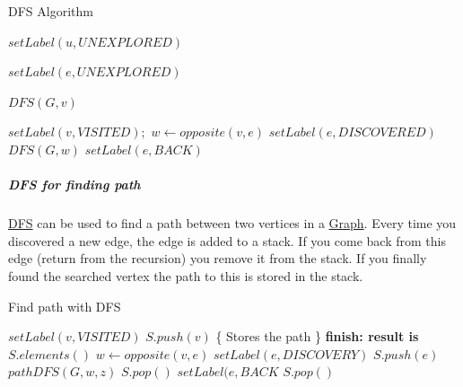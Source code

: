 \documentclass[11pt,twoside,twocolumn,landscape]{article}
\begin{document}
\begin{algorithm}
  \caption{DFS Algorithm}
  \begin{algorithmic}[1]
    \State $setLabel(u, UNEXPLORED)$
    \EndFor

    \State $setLabel(e, UNEXPLORED)$
    \EndFor

    \State $DFS(G, v)$
    \EndIf
    \EndFor
    \EndProcedure
  \end{algorithmic}
  \begin{algorithmic}[1]
    \State $setLabel(v, VISITED);$
    \State $w \leftarrow opposite(v,e)$
    \State $setLabel(e, DISCOVERED)$
    \State $DFS(G, w)$
    \Else
    \State $setLabel(e, BACK)$
    \EndIf
    \EndIf
    \EndFor
    \EndProcedure
  \end{algorithmic}
\end{algorithm}

\subparagraph{DFS for finding path}
\label{sec:org09fb26f}

\href{../../../roam/20220202095038-dfs.org}{DFS} can be used to find a path between two vertices in a \href{../../../roam/20220201163000-graph.org}{Graph}.
Every time you discovered a new edge, the edge is added to a stack.
If you come back from this edge (return from the recursion) you remove it from the stack.
If you finally found the searched vertex the path to this is stored in the stack.




\begin{algorithm}
  \caption{Find path with DFS}
  \begin{algorithmic}[1]
    \State $setLabel(v, VISITED)$
    \State $S.push(v)$ \{ Stores the path \}
    \State \textbf{finish: result is} $S.elements()$
    \EndIf
    \State $w \leftarrow opposite(v, e)$
    \State $setLabel(e, DISCOVERY)$
    \State $S.push(e)$
    \State $pathDFS(G, w, z)$
    \State $S.pop()$
    \Else
    \State $setLabel(e, BACK$
    \EndIf
    \EndIf
    \EndFor
    \State $S.pop()$
    \EndProcedure
  \end{algorithmic}
\end{algorithm}
\end{document}
